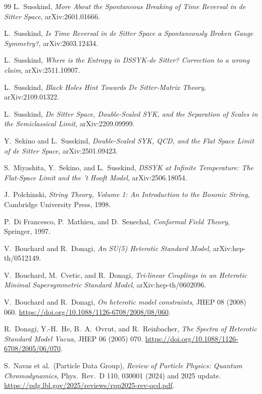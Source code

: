 \documentclass[11pt]{article}
\theoremstyle{remark}
\theoremstyle{plain}
\begin{document}
\begin{thebibliography}{99}
L.\ Susskind,
\emph{More About the Spontaneous Breaking of Time Reversal in de Sitter Space},
arXiv:2601.01666.

L.\ Susskind,
\emph{Is Time Reversal in de Sitter Space a Spontaneously Broken Gauge Symmetry?},
arXiv:2603.12434.

L.\ Susskind,
\emph{Where is the Entropy in DSSYK-de Sitter? Correction to a wrong claim},
arXiv:2511.10907.

L.\ Susskind,
\emph{Black Holes Hint Towards De Sitter-Matrix Theory},
arXiv:2109.01322.

L.\ Susskind,
\emph{De Sitter Space, Double-Scaled SYK, and the Separation of Scales in the Semiclassical Limit},
arXiv:2209.09999.

Y.\ Sekino and L.\ Susskind,
\emph{Double-Scaled SYK, QCD, and the Flat Space Limit of de Sitter Space},
arXiv:2501.09423.

S.\ Miyashita, Y.\ Sekino, and L.\ Susskind,
\emph{DSSYK at Infinite Temperature: The Flat-Space Limit and the 't Hooft Model},
arXiv:2506.18054.

J.\ Polchinski,
\emph{String Theory, Volume 1: An Introduction to the Bosonic String},
Cambridge University Press, 1998.

P.\ Di Francesco, P.\ Mathieu, and D.\ Senechal,
\emph{Conformal Field Theory},
Springer, 1997.

V.\ Bouchard and R.\ Donagi,
\emph{An SU(5) Heterotic Standard Model},
arXiv:hep-th/0512149.

V.\ Bouchard, M.\ Cvetic, and R.\ Donagi,
\emph{Tri-linear Couplings in an Heterotic Minimal Supersymmetric Standard Model},
arXiv:hep-th/0602096.

V.\ Bouchard and R.\ Donagi,
\emph{On heterotic model constraints},
JHEP 08 (2008) 060.
\url{https://doi.org/10.1088/1126-6708/2008/08/060}.

R.\ Donagi, Y.-H.\ He, B.\ A.\ Ovrut, and R.\ Reinbacher,
\emph{The Spectra of Heterotic Standard Model Vacua},
JHEP 06 (2005) 070.
\url{https://doi.org/10.1088/1126-6708/2005/06/070}.

S.\ Navas et al.\ (Particle Data Group),
\emph{Review of Particle Physics: Quantum Chromodynamics},
Phys.\ Rev.\ D 110, 030001 (2024) and 2025 update.
\url{https://pdg.lbl.gov/2025/reviews/rpp2025-rev-qcd.pdf}.


\end{thebibliography}
\end{document}
